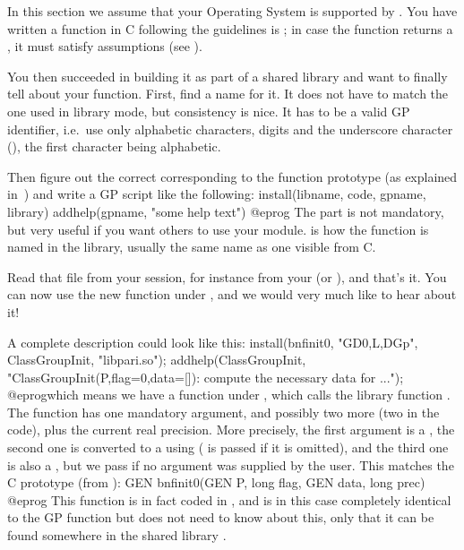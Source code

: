 
In this section we assume that your Operating System is supported by
. You have written a function in C following the guidelines is
; in case the function returns a , it
must satisfy  assumptions (see ).

You then succeeded in building it as part of a shared library and want to
finally tell  about your function. First, find a name for it. It does
not have to match the one used in library mode, but consistency is nice. It
has to be a valid GP identifier, i.e.~use only alphabetic characters, digits
and the underscore character (\kbd{\_}), the first character being
alphabetic.

Then figure out the correct  corresponding to the function
prototype (as explained in~) and write a GP script
like the following:
\bprog
install(libname, code, gpname, library)
addhelp(gpname, "some help text")
@eprog
\noindent The  part is not mandatory, but very useful if you
want others to use your module.  is how the function is named in
the library, usually the same name as one visible from C.

Read that file from your  session, for instance from your
 (or ), and that's it. You
can now use the new function  under , and we would very
much like to hear about it!
\smallskip

A complete description could look like this:
\bprog
{
  install(bnfinit0, "GD0,L,DGp", ClassGroupInit, "libpari.so");
  addhelp(ClassGroupInit, "ClassGroupInit(P,{flag=0},{data=[]}):
    compute the necessary data for ...");
}
@eprog\noindent which means we have a function  under
, which calls the library function  . The function has
one mandatory argument, and possibly two more (two  in the code),
plus the current real precision. More precisely, the first argument is a
, the second one is converted to a  using 
( is passed if it is omitted), and the third one is also a ,
but we pass  if no argument was supplied by the user. This matches
the C prototype (from ):
%
\bprog
  GEN bnfinit0(GEN P, long flag, GEN data, long prec)
@eprog\noindent
This function is in fact coded in , and is in this case
completely identical to the GP function  but  does not
need to know about this, only that it can be found somewhere in the shared
library .

